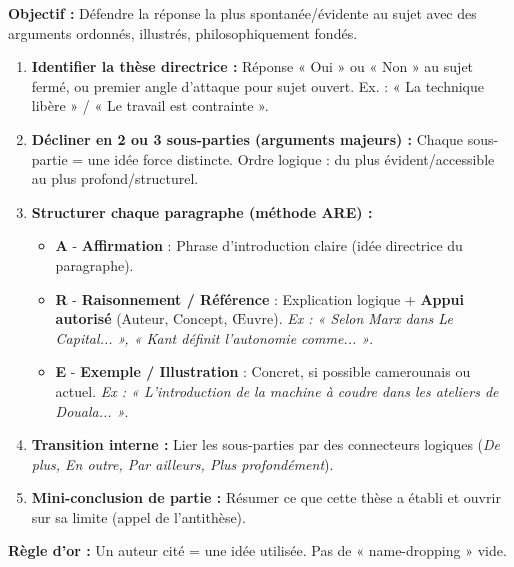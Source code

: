 \documentclass[11pt]{article}
\begin{document}
\begin{methode}
\textbf{Objectif :} Défendre la réponse la plus spontanée/évidente au sujet avec des arguments ordonnés, illustrés, philosophiquement fondés.
\begin{enumerate}
    \item \textbf{Identifier la thèse directrice :} Réponse « Oui » ou « Non » au sujet fermé, ou premier angle d'attaque pour sujet ouvert. Ex. : « La technique libère » / « Le travail est contrainte ».
    \item \textbf{Décliner en 2 ou 3 sous-parties (arguments majeurs) :} Chaque sous-partie = une idée force distincte. Ordre logique : du plus évident/accessible au plus profond/structurel.
    \item \textbf{Structurer chaque paragraphe (méthode ARE) :}
        \begin{itemize}
            \item \textbf{A} - \textbf{Affirmation} : Phrase d'introduction claire (idée directrice du paragraphe).
            \item \textbf{R} - \textbf{Raisonnement / Référence} : Explication logique + \textbf{Appui autorisé} (Auteur, Concept, Œuvre). \emph{Ex : « Selon Marx dans \emph{Le Capital}... », « Kant définit l'autonomie comme... »}.
            \item \textbf{E} - \textbf{Exemple / Illustration} : Concret, si possible camerounais ou actuel. \emph{Ex : « L'introduction de la machine à coudre dans les ateliers de Douala... »}.
        \end{itemize}
    \item \textbf{Transition interne :} Lier les sous-parties par des connecteurs logiques (\emph{De plus, En outre, Par ailleurs, Plus profondément}).
    \item \textbf{Mini-conclusion de partie :} Résumer ce que cette thèse a établi et ouvrir sur sa limite (appel de l'antithèse).
\end{enumerate}
\textbf{Règle d'or :} Un auteur cité = une idée utilisée. Pas de « name-dropping » vide.
\end{methode}
\end{document}
